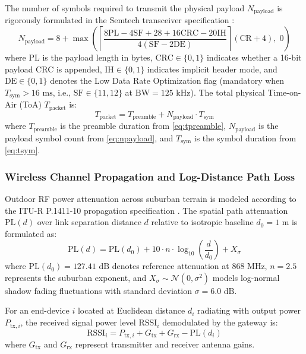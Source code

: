 \documentclass[preprint,review,12pt]{elsarticle}
\begin{document}
The number of symbols required to transmit the physical payload $N_{\text{payload}}$ is rigorously formulated in the Semtech transceiver specification \cite{semtech2020sx1276}:
\begin{equation}
\label{eq:npayload}
N_{\text{payload}} = 8 + \max\left( \left\lceil \frac{8\text{PL} - 4\text{SF} + 28 + 16\text{CRC} - 20\text{IH}}{4(\text{SF} - 2\text{DE})} \right\rceil (\text{CR} + 4), \; 0 \right)
\end{equation}
where $\text{PL}$ is the payload length in bytes, $\text{CRC} \in \{0, 1\}$ indicates whether a 16-bit payload CRC is appended, $\text{IH} \in \{0, 1\}$ indicates implicit header mode, and $\text{DE} \in \{0, 1\}$ denotes the Low Data Rate Optimization flag (mandatory when $T_{\text{sym}} > 16\text{ ms}$, i.e., $\text{SF} \in \{11, 12\}$ at $\text{BW} = 125\text{ kHz}$). The total physical Time-on-Air (ToA) $T_{\text{packet}}$ is:
\begin{equation}
\label{eq:toa}
T_{\text{packet}} = T_{\text{preamble}} + N_{\text{payload}} \cdot T_{\text{sym}}
\end{equation}
where $T_{\text{preamble}}$ is the preamble duration from \eqref{eq:tpreamble}, $N_{\text{payload}}$ is the payload symbol count from \eqref{eq:npayload}, and $T_{\text{sym}}$ is the symbol duration from \eqref{eq:tsym}.

\subsubsection{Wireless Channel Propagation and Log-Distance Path Loss}
Outdoor RF power attenuation across suburban terrain is modeled according to the ITU-R P.1411-10 propagation specification \cite{itur2019p1411}. The spatial path attenuation $\text{PL}(d)$ over link separation distance $d$ relative to isotropic baseline $d_0 = 1\text{ m}$ is formulated as:
\begin{equation}
\label{eq:pathloss}
\text{PL}(d) = \text{PL}(d_0) + 10 \cdot n \cdot \log_{10}\left(\frac{d}{d_0}\right) + X_\sigma
\end{equation}
where $\text{PL}(d_0) = 127.41\text{ dB}$ denotes reference attenuation at $868\text{ MHz}$, $n = 2.5$ represents the suburban exponent, and $X_\sigma \sim \mathcal{N}(0, \sigma^2)$ models log-normal shadow fading fluctuations with standard deviation $\sigma = 6.0\text{ dB}$.

For an end-device $i$ located at Euclidean distance $d_i$ radiating with output power $P_{\text{tx}, i}$, the received signal power level $\text{RSSI}_i$ demodulated by the gateway is:
\begin{equation}
\label{eq:rssi}
\text{RSSI}_i = P_{\text{tx}, i} + G_{\text{tx}} + G_{\text{rx}} - \text{PL}(d_i)
\end{equation}
where $G_{\text{tx}}$ and $G_{\text{rx}}$ represent transmitter and receiver antenna gains.
\end{document}
